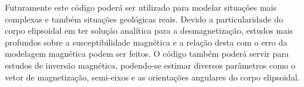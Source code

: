 Futuramente este código poderá ser utilizado para modelar situações mais complexas e também situações geológicas reais. Devido a particularidade do corpo elipsoidal em ter solução analítica para a desmagnetização, estudos mais profundos sobre a susceptibilidade magnética e a relação desta com o erro da modelagem magnética podem ser feitos. O código também poderá servir para estudos de inversão magnética, podendo-se estimar diversos parâmetros como o vetor de magnetização, semi-eixos e as orientações angulares do corpo elipsoidal.

